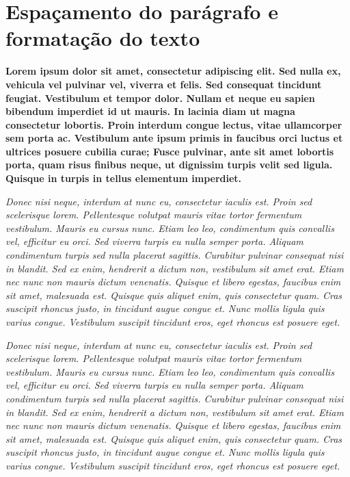 \documentclass[12pt]{article}
\begin{document}
\twocolumn %
\section{Espaçamento do parágrafo e formatação do texto}


\onehalfspacing %

\textbf{
Lorem ipsum dolor sit amet, consectetur adipiscing elit. Sed nulla ex, vehicula vel pulvinar vel, viverra et felis. Sed consequat tincidunt feugiat. Vestibulum et tempor dolor. Nullam et neque eu sapien bibendum imperdiet id ut mauris. In lacinia diam ut magna consectetur lobortis. Proin interdum congue lectus, vitae ullamcorper sem porta ac. Vestibulum ante ipsum primis in faucibus orci luctus et ultrices posuere cubilia curae; Fusce pulvinar, ante sit amet lobortis porta, quam risus finibus neque, ut dignissim turpis velit sed ligula. Quisque in turpis in tellus elementum imperdiet.
}

\begin{doublespace} %

\textit{
	Donec nisi neque, interdum at nunc eu, consectetur iaculis est. Proin sed scelerisque lorem. Pellentesque volutpat mauris vitae tortor fermentum vestibulum. Mauris eu cursus nunc. Etiam leo leo, condimentum quis convallis vel, efficitur eu orci. Sed viverra turpis eu nulla semper porta. Aliquam condimentum turpis sed nulla placerat sagittis. Curabitur pulvinar consequat nisi in blandit. Sed ex enim, hendrerit a dictum non, vestibulum sit amet erat. Etiam nec nunc non mauris dictum venenatis. Quisque et libero egestas, faucibus enim sit amet, malesuada est. Quisque quis aliquet enim, quis consectetur quam. Cras suscipit rhoncus justo, in tincidunt augue congue et. Nunc mollis ligula quis varius congue. Vestibulum suscipit tincidunt eros, eget rhoncus est posuere eget.
}
\end{doublespace}

\vspace{2cm} %


\textit{
Donec nisi neque, interdum at nunc eu, consectetur iaculis est. Proin sed scelerisque lorem. Pellentesque volutpat mauris vitae tortor fermentum vestibulum. Mauris eu cursus nunc. Etiam leo leo, condimentum quis convallis vel, efficitur eu orci. Sed viverra turpis eu nulla semper porta. Aliquam condimentum turpis sed nulla placerat sagittis. Curabitur pulvinar consequat nisi in blandit. Sed ex enim, hendrerit a dictum non, vestibulum sit amet erat. Etiam nec nunc non mauris dictum venenatis. Quisque et libero egestas, faucibus enim sit amet, malesuada est. Quisque quis aliquet enim, quis consectetur quam. Cras suscipit rhoncus justo, in tincidunt augue congue et. Nunc mollis ligula quis varius congue. Vestibulum suscipit tincidunt eros, eget rhoncus est posuere eget.
}
\end{document}

